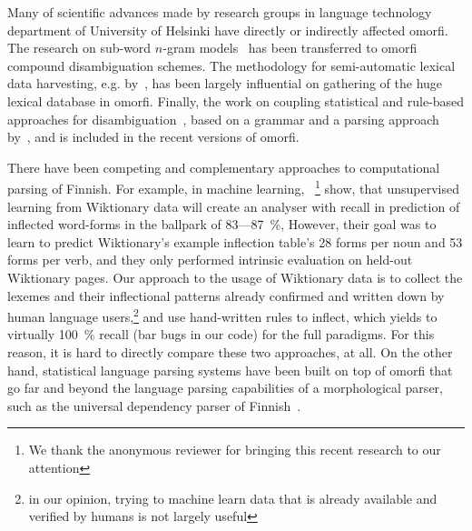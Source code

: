\documentclass[a4paper,12pt]{article}
\begin{document}
Many of scientific advances made by research groups
in language technology department of University of
Helsinki have directly or indirectly affected
omorfi. The research on sub-word \(n\)-gram
models~\citep{pirinen2009weighted,pirinen2009weighting}
has been transferred to omorfi compound
disambiguation schemes. The methodology for
semi-automatic lexical data harvesting, e.g.
by~\citep{linden2008probabilistic}, has been largely
influential on gathering of the huge lexical
database in omorfi. Finally, the work on coupling
statistical and rule-based approaches for
disambiguation~\citep{pirinen2015using}, based on a
grammar and a parsing approach
by~\citet{karlsson1995constraint}, and is included
in the recent versions of omorfi.

There have been competing and complementary approaches to computational
parsing of Finnish. For example, in machine learning,
~\citet{durrett2013supervised}\footnote{We thank the anonymous reviewer for
bringing this recent research to our attention} show, that unsupervised
learning from Wiktionary data will create an analyser with recall in
prediction of inflected word-forms in the ballpark of 83---87~\%, However,
their goal was to learn to predict Wiktionary's example inflection table's
28 forms per noun and 53 forms per verb, and they only performed intrinsic
evaluation on held-out Wiktionary pages. Our approach to the usage of Wiktionary
data is to collect the lexemes and their inflectional patterns already
confirmed and written down by human language users,\footnote{in our opinion,
trying to machine learn data that is already available and verified by
humans is not largely useful} and use hand-written rules to inflect, which
yields to virtually 100~\% recall (bar bugs in our code) for the full
paradigms. For this reason, it is hard to directly compare these two
approaches, at all. On the other hand, statistical language parsing systems
have been built on top of omorfi that go far and beyond the language parsing
capabilities of a morphological parser, such as the universal dependency
parser of Finnish~\cite{pyysalo2015universal}.
\end{document}
